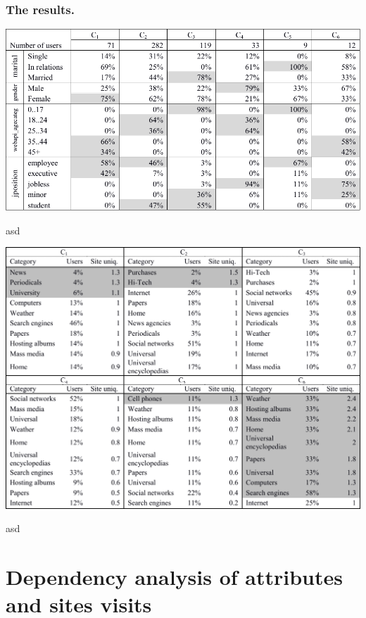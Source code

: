 \documentclass[runningheads,a4paper]{llncs}
\begin{document}
\subsubsection{The results.}



\begin{table}\label{OWoti}
	\includegraphics[width=\linewidth]{t1.pdf}
	
	\caption{asd}
\end{table}



\begin{table}\label{01Yti}
	\includegraphics[width=\linewidth]{t2.pdf}
	
	\caption{asd}
\end{table}



\section{Dependency analysis of attributes and sites visits}
\end{document}
